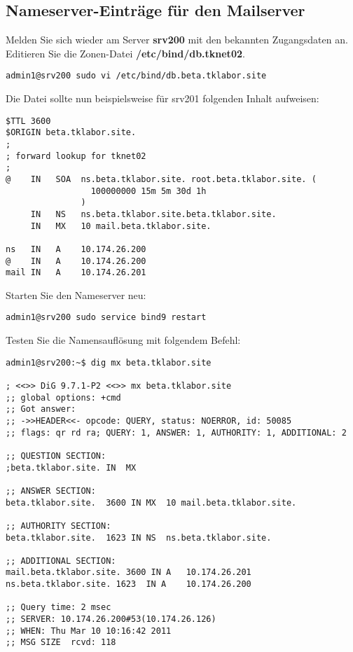 \subsection{Nameserver-Einträge für den Mailserver}
Melden Sie 
sich wieder am Server \textbf{srv200} mit den bekannten Zugangsdaten an. Editieren Sie die Zonen-Datei \textbf{/etc/bind/db.tknet02}.
\begin{lstlisting}
admin1@srv200 sudo vi /etc/bind/db.beta.tklabor.site
\end{lstlisting}
Die Datei sollte nun beispielsweise für srv201 folgenden Inhalt aufweisen:
\begin{scriptsize}
\begin{lstlisting}
$TTL 3600
$ORIGIN beta.tklabor.site.
;
; forward lookup for tknet02
;
@    IN   SOA  ns.beta.tklabor.site. root.beta.tklabor.site. ( 
                 100000000 15m 5m 30d 1h 
               )
     IN   NS   ns.beta.tklabor.site.beta.tklabor.site.
     IN   MX   10 mail.beta.tklabor.site.

ns   IN   A    10.174.26.200
@    IN   A    10.174.26.200
mail IN   A    10.174.26.201
\end{lstlisting}
\end{scriptsize}
Starten Sie den Nameserver neu:
\begin{lstlisting}
admin1@srv200 sudo service bind9 restart
\end{lstlisting}
Testen Sie die Namensauflösung mit folgendem Befehl:
\begin{scriptsize}
\begin{lstlisting}
admin1@srv200:~$ dig mx beta.tklabor.site

; <<>> DiG 9.7.1-P2 <<>> mx beta.tklabor.site
;; global options: +cmd
;; Got answer:
;; ->>HEADER<<- opcode: QUERY, status: NOERROR, id: 50085
;; flags: qr rd ra; QUERY: 1, ANSWER: 1, AUTHORITY: 1, ADDITIONAL: 2

;; QUESTION SECTION:
;beta.tklabor.site.	IN	MX

;; ANSWER SECTION:
beta.tklabor.site.	3600 IN	MX	10 mail.beta.tklabor.site.

;; AUTHORITY SECTION:
beta.tklabor.site.	1623 IN	NS	ns.beta.tklabor.site.

;; ADDITIONAL SECTION:
mail.beta.tklabor.site. 3600 IN A	10.174.26.201
ns.beta.tklabor.site. 1623	IN A	10.174.26.200

;; Query time: 2 msec
;; SERVER: 10.174.26.200#53(10.174.26.126)
;; WHEN: Thu Mar 10 10:16:42 2011
;; MSG SIZE  rcvd: 118
\end{lstlisting}
\end{scriptsize}

